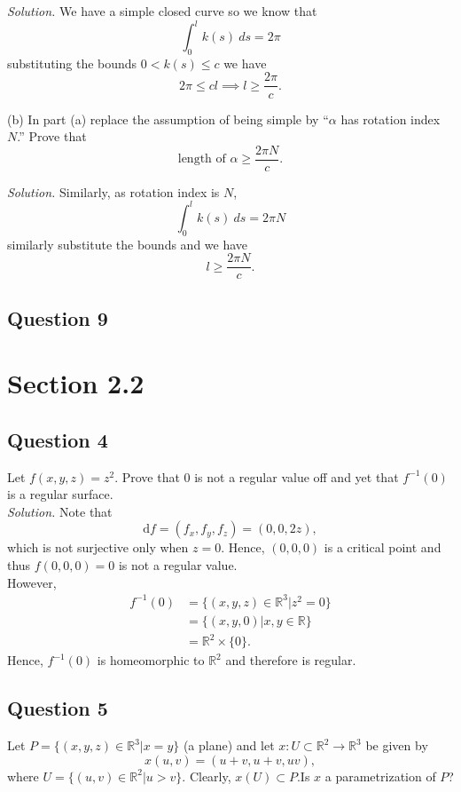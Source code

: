 \documentclass[12pt]{article}
\begin{document}
\textit{Solution.}
We have a simple closed curve so we know that
\[ \int_0^l k(s)\ ds = 2\pi \]
substituting the bounds \(0<k(s)\leq c\) we have
\[ 2\pi \leq cl \implies l \geq \frac{2\pi}c. \]

(b) In part (a) replace the assumption of being simple by ``\(\alpha\) has rotation index \(N\).'' Prove that
\[ \text{length of }\alpha \geq \frac{2\pi N}c. \]

\textit{Solution.}
Similarly, as rotation index is \(N\),
\[ \int_0^l k(s)\ ds = 2\pi N \]
similarly substitute the bounds and we have
\[ l \geq \frac{2\pi N}c. \]

\subsection*{Question 9}

\section{Section 2.2}

\subsection*{Question 4}
Let $f(x, y, z) = z^2$. Prove that $0$ is not a regular value off and yet that $f^{-1}(0)$ is a regular surface.\\

\textit{Solution.} Note that \begin{equation*}
    \mathrm df = (f_x,f_y,f_z) = (0,0,2z),
\end{equation*}
which is not surjective only when $z=0$. Hence, $(0,0,0)$ is a critical point and thus $f(0,0,0)=0$ is not a regular value.\\

However, \begin{align*}
    f^{-1}(0) &= \{(x,y,z)\in \mathbb{R}^3|z^2 = 0\}\\
    &= \{(x,y,0)|x,y \in \mathbb{R}\} \\
    &= \mathbb{R}^2 \times \{0\}.
\end{align*}
Hence, $f^{-1}(0)$ is homeomorphic to $\mathbb{R}^2$ and therefore is regular.

\subsection*{Question 5}
Let $P= \{(x,y,z)\in \mathbb{R}^3|x= y\}$ (a plane) and let $x:U \subset \mathbb{R}^2 \to \mathbb{R}^3$ be given by \begin{equation*}
    x(u,v) = (u+v,u+v,uv),
\end{equation*}
 where $U=\{(u,v)\in \mathbb{R}^2|u>v\}$. Clearly, $x(U)\subset P$.Is $x$ a parametrization of $P$?\\
\end{document}
